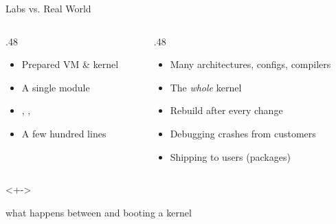\begin{frame}{Labs vs. Real World}

  \begin{columns}[T]
    \begin{column}{.48\textwidth}
      \begin{itemize}
	\item Prepared VM \& kernel
	\item A single module
	\item {}, , 
	\item A few hundred lines
      \end{itemize}
    \end{column}

    \pause

    \begin{column}{.48\textwidth}
      \begin{itemize}[<+->]
	\item Many architectures, configs, compilers
	\item The \emph{whole} kernel
	\item Rebuild after every change
	\item Debugging crashes from customers
	\item Shipping to users (packages)
      \end{itemize}
    \end{column}
  \end{columns}

  \vspace{2em}

  \begin{uncoverenv}<+->
    \begin{center}
       what happens between  and booting a kernel
    \end{center}
  \end{uncoverenv}

\end{frame}

